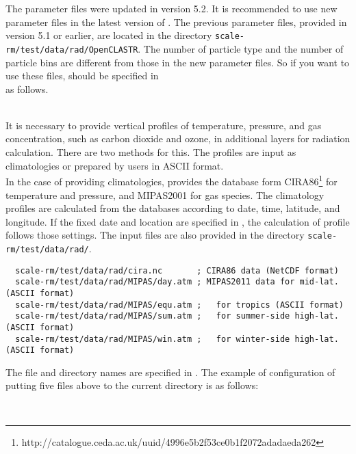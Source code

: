 The parameter files were updated in version 5.2.
It is recommended to use new parameter files in the latest version of \scalerm.
The previous parameter files, provided in version 5.1 or earlier, 
are located in the directory \verb|scale-rm/test/data/rad/OpenCLASTR|.
The number of particle type and the number of particle bins are different from those in the new parameter files.
So if you want to use these files,  should be specified in \\
 as follows.

\\

It is necessary to provide vertical profiles of temperature, pressure, and gas concentration, such as carbon dioxide and ozone,
in additional layers for radiation calculation.
There are two methods for this. The profiles are input as climatologies or prepared by users in ASCII format. \\

In the case of providing climatologies, \scalerm provides the database form CIRA86\footnote{http://catalogue.ceda.ac.uk/uuid/4996e5b2f53ce0b1f2072adadaeda262} \citep{CSR_2006} for temperature and pressure,
and MIPAS2001 \citep{Remedios_2007} for gas species.
The climatology profiles are calculated from the databases according to date, time, latitude, and longitude.
If the fixed date and location are specified in , the calculation of profile follows those settings.
The input files are also provided in the directory \verb|scale-rm/test/data/rad/|.
\begin{verbatim}
  scale-rm/test/data/rad/cira.nc       ; CIRA86 data (NetCDF format)
  scale-rm/test/data/rad/MIPAS/day.atm ; MIPAS2011 data for mid-lat. (ASCII format)
  scale-rm/test/data/rad/MIPAS/equ.atm ;   for tropics (ASCII format)
  scale-rm/test/data/rad/MIPAS/sum.atm ;   for summer-side high-lat. (ASCII format)
  scale-rm/test/data/rad/MIPAS/win.atm ;   for winter-side high-lat. (ASCII format)
\end{verbatim}
The file and directory names are specified in .
The example of configuration of putting five files above to the current directory is as follows:

\\


